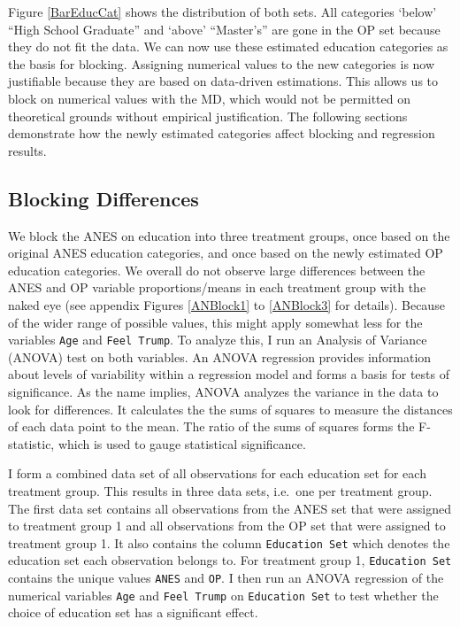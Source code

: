 \documentclass[12pt,econ]{sources/authesis}
\begin{document}
Figure \ref{BarEducCat} shows the distribution of both sets. All categories `below' ``High School Graduate'' and `above' ``Master's'' are gone in the OP set because they do not fit the data. We can now use these estimated education categories as the basis for blocking. Assigning numerical values to the new categories is now justifiable because they are based on data-driven estimations. This allows us to block on numerical values with the MD, which would not be permitted on theoretical grounds without empirical justification. The following sections demonstrate how the newly estimated categories affect blocking and regression results.

\hypertarget{ordblock-data-blockdiff}{%
\subsection{Blocking Differences}\label{ordblock-data-blockdiff}}

We block the ANES on education into three treatment groups, once based on the original ANES education categories, and once based on the newly estimated OP education categories. We overall do not observe large differences between the ANES and OP variable proportions/means in each treatment group with the naked eye (see appendix Figures \ref{ANBlock1} to \ref{ANBlock3} for details). Because of the wider range of possible values, this might apply somewhat less for the variables \texttt{Age} and \texttt{Feel\ Trump}. To analyze this, I run an Analysis of Variance (ANOVA) test on both variables. An ANOVA regression provides information about levels of variability within a regression model and forms a basis for tests of significance. As the name implies, ANOVA analyzes the variance in the data to look for differences. It calculates the the sums of squares to measure the distances of each data point to the mean. The ratio of the sums of squares forms the F-statistic, which is used to gauge statistical significance.

I form a combined data set of all observations for each education set for each treatment group. This results in three data sets, i.e.~one per treatment group. The first data set contains all observations from the ANES set that were assigned to treatment group 1 and all observations from the OP set that were assigned to treatment group 1. It also contains the column \texttt{Education\ Set} which denotes the education set each observation belongs to. For treatment group 1, \texttt{Education\ Set} contains the unique values \texttt{ANES} and \texttt{OP}. I then run an ANOVA regression of the numerical variables \texttt{Age} and \texttt{Feel\ Trump} on \texttt{Education\ Set} to test whether the choice of education set has a significant effect.
\end{document}
